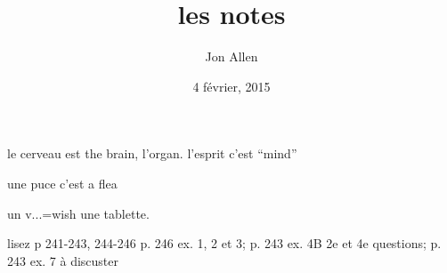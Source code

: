 \documentclass[letterpaper]{article}
\begin{document}
\title{les notes}
\date{4 février, 2015}
\author{Jon Allen}
\maketitle
le cerveau est the brain, l'organ. l'esprit c'est ``mind''

une puce c'est a flea

un v...=wish
une tablette.

lisez p 241-243, 244-246
p. 246 ex. 1, 2 et 3;  p. 243 ex. 4B 2e et 4e questions; p. 243 ex. 7 à discuster
\end{document}
